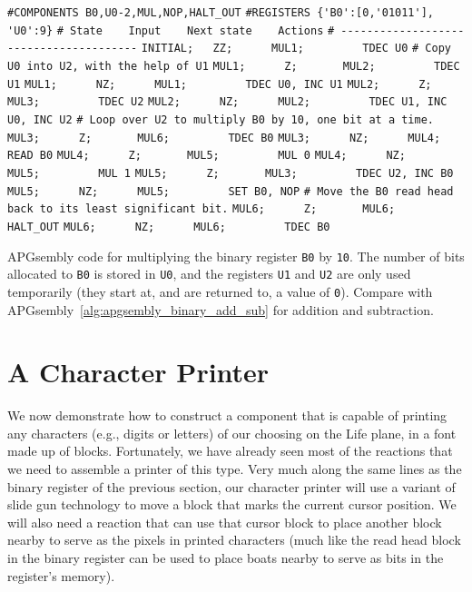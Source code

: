 \begin{apgsembly}
	\begin{algorithmic}\small
		\State \verb|#COMPONENTS B0,U0-2,MUL,NOP,HALT_OUT|
		\State \verb|#REGISTERS {'B0':[0,'01011'], 'U0':9}|
		\State \verb|# State    Input    Next state    Actions|
		\State \verb|# ---------------------------------------|
		\State \verb|INITIAL;   ZZ;      MUL1;         TDEC U0|
		\State \verb||
		\State \verb|# Copy U0 into U2, with the help of U1|
		\State \verb|MUL1;      Z;       MUL2;         TDEC U1|
		\State \verb|MUL1;      NZ;      MUL1;         TDEC U0, INC U1|
		\State \verb|MUL2;      Z;       MUL3;         TDEC U2|
		\State \verb|MUL2;      NZ;      MUL2;         TDEC U1, INC U0, INC U2|
		\State \verb||
		\State \verb|# Loop over U2 to multiply B0 by 10, one bit at a time.|
		\State \verb|MUL3;      Z;       MUL6;         TDEC B0|
		\State \verb|MUL3;      NZ;      MUL4;         READ B0|
		\State \verb|MUL4;      Z;       MUL5;         MUL 0|
		\State \verb|MUL4;      NZ;      MUL5;         MUL 1|
		\State \verb|MUL5;      Z;       MUL3;         TDEC U2, INC B0|
		\State \verb|MUL5;      NZ;      MUL5;         SET B0, NOP|
		\State \verb||
		\State \verb|# Move the B0 read head back to its least significant bit.|
		\State \verb|MUL6;      Z;       MUL6;         HALT_OUT|
		\State \verb|MUL6;      NZ;      MUL6;         TDEC B0|
	\end{algorithmic}
	\caption{APGsembly code for multiplying the binary register \texttt{B0} by \texttt{10}. The number of bits allocated to \texttt{B0} is stored in \texttt{U0}, and the registers \texttt{U1} and \texttt{U2} are only used temporarily (they start at, and are returned to, a value of \texttt{0}). Compare with APGsembly~\ref{alg:apgsembly_binary_add_sub} for addition and subtraction.}\label{alg:apgsembly_mul_ten}
\end{apgsembly}


\section{A Character Printer}\label{sec:decimal_printer}

We now demonstrate how to construct a component that is capable of printing any characters (e.g., digits or letters) of our choosing on the Life plane, in a font made up of blocks. Fortunately, we have already seen most of the reactions that we need to assemble a printer of this type. Very much along the same lines as the binary register of the previous section, our character printer will use a variant of slide gun technology to move a block that marks the current cursor position. We will also need a reaction that can use that cursor block to place another block nearby to serve as the pixels in printed characters (much like the read head block in the binary register can be used to place boats nearby to serve as bits in the register's memory).

